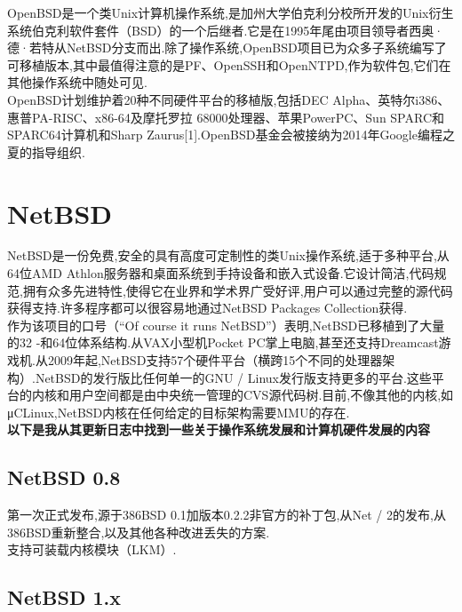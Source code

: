 \documentclass[a4paper,12pt,notitlepage]{article}
\begin{document}
	OpenBSD是一个类Unix计算机操作系统,是加州大学伯克利分校所开发的Unix衍生系统伯克利软件套件（BSD）的一个后继者.它是在1995年尾由项目领导者西奥·德·若特从NetBSD分支而出.除了操作系统,OpenBSD项目已为众多子系统编写了可移植版本,其中最值得注意的是PF、OpenSSH和OpenNTPD,作为软件包,它们在其他操作系统中随处可见. \\
	
	OpenBSD计划维护着20种不同硬件平台的移植版,包括DEC Alpha、英特尔i386、惠普PA-RISC、x86-64及摩托罗拉 68000处理器、苹果PowerPC、Sun SPARC和SPARC64计算机和Sharp Zaurus[1].OpenBSD基金会被接纳为2014年Google编程之夏的指导组织. \\
	
\section{NetBSD}

	NetBSD是一份免费,安全的具有高度可定制性的类Unix操作系统,适于多种平台,从64位AMD Athlon服务器和桌面系统到手持设备和嵌入式设备.它设计简洁,代码规范,拥有众多先进特性,使得它在业界和学术界广受好评,用户可以通过完整的源代码获得支持.许多程序都可以很容易地通过NetBSD Packages Collection获得. \\
	
	作为该项目的口号（“Of course it runs NetBSD”）表明,NetBSD已移植到了大量的32 -和64位体系结构.从VAX小型机Pocket PC掌上电脑,甚至还支持Dreamcast游戏机.从2009年起,NetBSD支持57个硬件平台（横跨15个不同的处理器架构）.NetBSD的发行版比任何单一的GNU / Linux发行版支持更多的平台.这些平台的内核和用户空间都是由中央统一管理的CVS源代码树.目前,不像其他的内核,如μCLinux,NetBSD内核在任何给定的目标架构需要MMU的存在. \\
	
	\textbf{以下是我从其更新日志中找到一些关于操作系统发展和计算机硬件发展的内容}

\subsection{NetBSD 0.8}

	第一次正式发布,源于386BSD 0.1加版本0.2.2非官方的补丁包,从Net / 2的发布,从386BSD重新整合,以及其他各种改进丢失的方案. \\
	
	支持可装载内核模块（LKM）. 

\subsection{NetBSD 1.x}
\end{document}
